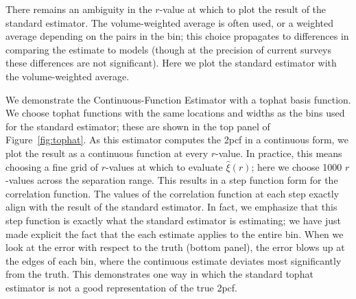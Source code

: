 \documentclass[modern]{aastex62}
\newcommand{\cf}{2pcf\xspace} %
\newcommand{\est}{the Continuous-Function Estimator\xspace}
\begin{document}
There remains an ambiguity in the $r$-value at which to plot the result of the standard estimator. 
The volume-weighted average is often used, or a weighted average depending on the pairs in the bin; this choice propagates to differences in comparing the estimate to models (though at the precision of current surveys these differences are not significant).
Here we plot the standard estimator with the volume-weighted average.

We demonstrate \est with a tophat basis function.
We choose tophat functions with the same locations and widths as the bins used for the standard estimator; these are shown in the top panel of Figure~\ref{fig:tophat}. 
As this estimator computes the \cf in a continuous form, we plot the result as a continuous function at every $r$-value.
In practice, this means choosing a fine grid of $r$-values at which to evaluate $\hat{\xi}(r)$; here we choose 1000 $r$-values across the separation range.
This results in a step function form for the correlation function.
The values of the correlation function at each step exactly align with the result of the standard estimator.
In fact, we emphasize that this step function is exactly what the standard estimator is estimating; we have just made explicit the fact that the each estimate applies to the entire bin.
When we look at the error with respect to the truth (bottom panel), the error blows up at the edges of each bin, where the continuous estimate deviates most significantly from the truth.
This demonstrates one way in which the standard tophat estimator is not a good representation of the true \cf.
\end{document}
